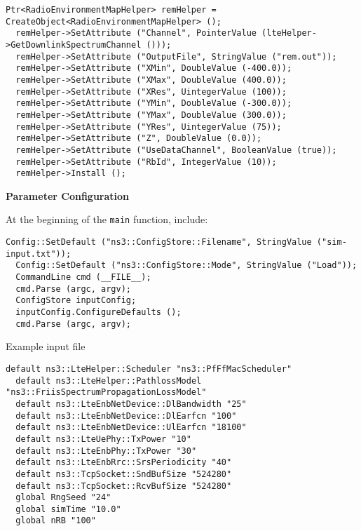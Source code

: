 \begin{lstlisting}[language=myC++,caption={Radio Environment Maps helper}, captionpos=b]
  Ptr<RadioEnvironmentMapHelper> remHelper = CreateObject<RadioEnvironmentMapHelper> ();
  remHelper->SetAttribute ("Channel", PointerValue (lteHelper->GetDownlinkSpectrumChannel ()));
  remHelper->SetAttribute ("OutputFile", StringValue ("rem.out"));
  remHelper->SetAttribute ("XMin", DoubleValue (-400.0));
  remHelper->SetAttribute ("XMax", DoubleValue (400.0));
  remHelper->SetAttribute ("XRes", UintegerValue (100));
  remHelper->SetAttribute ("YMin", DoubleValue (-300.0));
  remHelper->SetAttribute ("YMax", DoubleValue (300.0));
  remHelper->SetAttribute ("YRes", UintegerValue (75));
  remHelper->SetAttribute ("Z", DoubleValue (0.0));
  remHelper->SetAttribute ("UseDataChannel", BooleanValue (true));
  remHelper->SetAttribute ("RbId", IntegerValue (10));
  remHelper->Install ();
\end{lstlisting}

\textbf{Parameter Configuration}

At the beginning of the \texttt{main} function, include:

\begin{lstlisting}[language=myC++, caption={Configuration parameters}, captionpos=b]
  Config::SetDefault ("ns3::ConfigStore::Filename", StringValue ("sim-input.txt"));
  Config::SetDefault ("ns3::ConfigStore::Mode", StringValue ("Load"));
  CommandLine cmd (__FILE__);
  cmd.Parse (argc, argv);
  ConfigStore inputConfig;
  inputConfig.ConfigureDefaults ();
  cmd.Parse (argc, argv);
\end{lstlisting}

Example input file

\begin{lstlisting}[language=myshell, caption={Configuration parameters}, captionpos=b]
  default ns3::LteHelper::Scheduler "ns3::PfFfMacScheduler"
  default ns3::LteHelper::PathlossModel "ns3::FriisSpectrumPropagationLossModel"
  default ns3::LteEnbNetDevice::DlBandwidth "25"
  default ns3::LteEnbNetDevice::DlEarfcn "100"
  default ns3::LteEnbNetDevice::UlEarfcn "18100"
  default ns3::LteUePhy::TxPower "10"
  default ns3::LteEnbPhy::TxPower "30"
  default ns3::LteEnbRrc::SrsPeriodicity "40"
  default ns3::TcpSocket::SndBufSize "524280"
  default ns3::TcpSocket::RcvBufSize "524280"
  global RngSeed "24"
  global simTime "10.0"
  global nRB "100"
\end{lstlisting}

\clearpage

